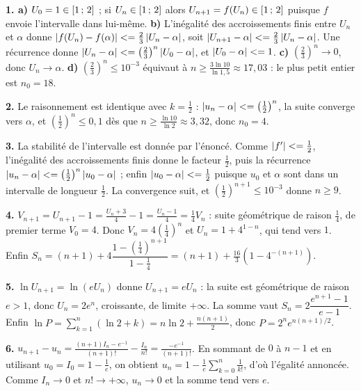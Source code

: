 \begin{corrige}[annales]
\textbf{1. a)} $U_{0} = 1 \in \left[1\,;\,2\right]$ ; si $U_{n} \in
\left[1\,;\,2\right]$ alors $U_{n+1} = f(U_{n}) \in \left[1\,;\,2\right]$ puisque
$f$ envoie l'intervalle dans lui-même.
\textbf{b)} L'inégalité des accroissements finis entre $U_{n}$ et $\alpha$
donne $\left|f(U_{n})-f(\alpha)\right| <= \frac23\left|U_{n}-\alpha\right|$, soit
$\left|U_{n+1}-\alpha\right| <= \frac23\left|U_{n}-\alpha\right|$. Une récurrence donne
$\left|U_{n}-\alpha\right| <= \left(\frac23\right)^{n}\left|U_{0}-\alpha\right|$, et
$\left|U_{0}-\alpha\right| <= 1$.
\textbf{c)} $\left(\frac23\right)^{n} \to 0$, donc $U_{n} \to \alpha$.
\textbf{d)} $\left(\frac23\right)^{n} \leq 10^{-3}$ équivaut à
$n \geq \frac{3\ln10}{\ln1{,}5} \approx 17{,}03$ : le plus petit entier est
$n_{0} = 18$.

\textbf{2.} Le raisonnement est identique avec $k = \frac12$ :
$\left|u_{n}-\alpha\right| <= \left(\frac12\right)^{n}$, la suite converge vers
$\alpha$, et $\left(\frac12\right)^{n} \leq 0{,}1$ dès que
$n \geq \frac{\ln10}{\ln2} \approx 3{,}32$, donc $n_{0} = 4$.

\textbf{3.} La stabilité de l'intervalle est donnée par l'énoncé. Comme
$\left|f'\right| <= \frac12$, l'inégalité des accroissements finis donne le
facteur $\frac12$, puis la récurrence
$\left|u_{n}-\alpha\right| <= \left(\frac12\right)^{n}\left|u_{0}-\alpha\right|$ ; enfin
$\left|u_{0}-\alpha\right| <= \frac12$ puisque $u_{0}$ et $\alpha$ sont dans un
intervalle de longueur $\frac12$. La convergence suit, et
$\left(\frac12\right)^{n+1} \leq 10^{-3}$ donne $n \geq 9$.

\textbf{4.} $V_{n+1} = U_{n+1}-1 = \frac{U_{n}+3}{4}-1 = \frac{U_{n}-1}{4}
= \frac14V_{n}$ : suite géométrique de raison $\frac14$, de premier terme
$V_{0} = 4$. Donc $V_{n} = 4\left(\frac14\right)^{n}$ et
$U_{n} = 1+4^{1-n}$, qui tend vers $1$. Enfin
$S_{n} = (n+1)+4\dfrac{1-\left(\frac14\right)^{n+1}}{1-\frac14}
= (n+1)+\frac{16}{3}\left(1-4^{-(n+1)}\right)$.

\textbf{5.} $\ln U_{n+1} = \ln(eU_{n})$ donne $U_{n+1} = eU_{n}$ : la suite
est géométrique de raison $e>1$, donc $U_{n} = 2e^{n}$, croissante, de limite
$+\infty$. La somme vaut $S_{n} = 2\dfrac{e^{n+1}-1}{e-1}$. Enfin
$\ln P = \sum_{k=1}^{n}\left(\ln2+k\right) = n\ln2+\frac{n(n+1)}{2}$, donc
$P = 2^{n}e^{n(n+1)/2}$.

\textbf{6.} $u_{n+1}-u_{n} = \frac{(n+1)I_{n}-e^{-1}}{(n+1)!}
-\frac{I_{n}}{n!} = \frac{-e^{-1}}{(n+1)!}$. En sommant de $0$ à $n-1$ et en
utilisant $u_{0} = I_{0} = 1-\frac1e$, on obtient
$u_{n} = 1-\frac1e\sum_{k=0}^{n}\frac{1}{k!}$, d'où l'égalité annoncée. Comme
$I_{n} \to 0$ et $n! \to +\infty$, $u_{n} \to 0$ et la somme tend vers $e$.


\end{corrige}
